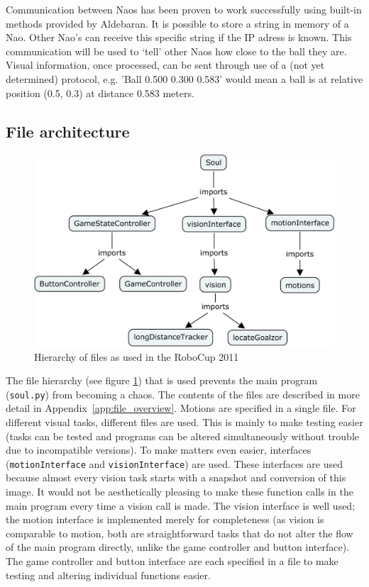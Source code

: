 \documentclass[11pt,a4paper,oneside]{article}
\begin{document}
Communication between Naos has been proven to work successfully using built-in methods provided by Aldebaran. It is possible to store a string in memory of a Nao. Other Nao's can receive this specific string if the IP adress is known. This communication will be used to `tell' other Naos how close to the ball they are. Visual information, once processed, can be sent through use of a (not yet determined) protocol, e.g. 'Ball 0.500 0.300 0.583' would mean a ball is at relative position (0.5, 0.3) at distance 0.583 meters.

\subsection{File architecture}
\begin{figure}[htb]    	
\centering
\includegraphics[width=0.7\columnwidth]{cmapFiles.png}
\caption{Hierarchy of files as used in the RoboCup 2011}
\label{fig:File}
\end{figure}
The file hierarchy (see figure \ref{fig:File}) that is used prevents the main program (\texttt{soul.py}) from becoming a chaos. The contents of the files are described in more detail in Appendix~\ref{app:file_overview}.
Motions are specified in a single file. 
For different visual tasks, different files are used. This is mainly to make testing easier (tasks can be tested and programs can be altered simultaneously without trouble due to incompatible versions). 
To make matters even easier, interfaces (\texttt{motionInterface} and \texttt{visionInterface}) are used. These interfaces are used because almost every vision task starts with a snapshot and conversion of this image. 
It would not be aesthetically pleasing to make these function calls in the main program every time a vision call is made. 
The vision interface is well used; the motion interface is implemented merely for completeness (as vision is comparable to motion, both are straightforward tasks that do not alter the flow of the main program directly, unlike the game controller and button interface). The game controller and button interface are each specified in a file to make testing and altering individual functions easier.
\end{document}
